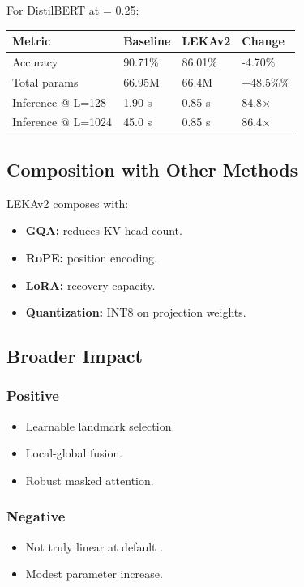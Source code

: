 For DistilBERT at   = 0.25:

\begin{table}[H]
\centering
\small
\begin{tabular}{llll}
\toprule
\textbf{Metric} & \textbf{Baseline} & \textbf{LEKAv2} & \textbf{Change} \\
\midrule
Accuracy & 90.71\% & 86.01\% & -4.70\% \\
Total params & 66.95M & 66.4M & +48.5\%\% \\
Inference @ L=128 & 1.90 s & 0.85 s & 84.8$\times$ \\
Inference @ L=1024 & 45.0 s & 0.85 s & 86.4$\times$ \\
\bottomrule
\end{tabular}
\end{table}

\subsection{Composition with Other Methods}

LEKAv2 composes with:

\begin{itemize}
\item \textbf{GQA:} reduces KV head count.
\item \textbf{RoPE:} position encoding.
\item \textbf{LoRA:} recovery capacity.
\item \textbf{Quantization:} INT8 on projection weights.

\end{itemize}
\subsection{Broader Impact}

\subsubsection{Positive}
\begin{itemize}
\item Learnable landmark selection.
\item Local-global fusion.
\item Robust masked attention.

\end{itemize}
\subsubsection{Negative}
\begin{itemize}
\item Not truly linear at default  .
\item Modest parameter increase.

\end{itemize}
